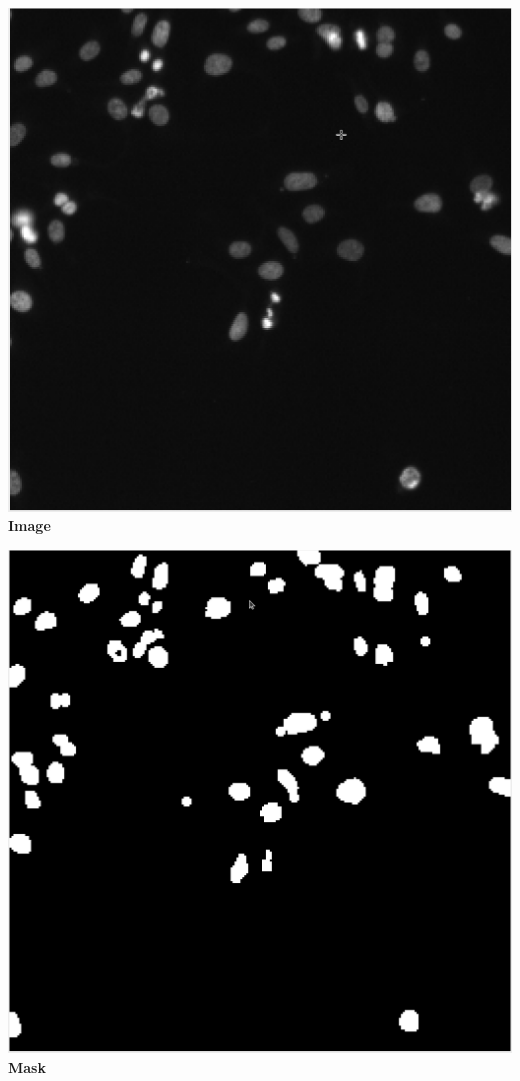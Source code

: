 \begin{minipage}[h!]{0.20\textwidth}
  \centering
  \includegraphics[scale=0.1]{./png/results/nuclei_image.png}
  \textbf{Image}
\end{minipage}\hfill
\begin{minipage}[h!]{0.20\textwidth}
  \centering
  \includegraphics[scale=0.1]{./png/results/nuclei_mask.png}
  \textbf{Mask}
\end{minipage}

